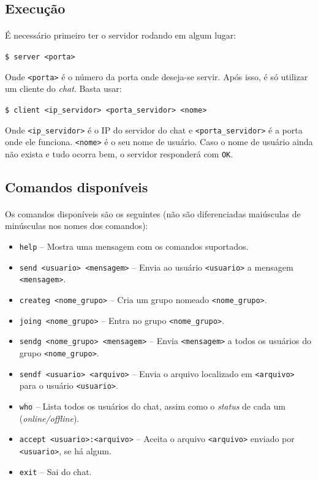\documentclass[11pt]{article}
\newcommand{\tit}[1]{\textit{#1}}
\newcommand{\ttt}[1]{\texttt{#1}}
\begin{document}
\subsection{Execução}
\paragraph{}
É necessário primeiro ter o servidor rodando em algum lugar:

\ttt{\$ server <porta>}

Onde \ttt{<porta>} é o número da porta onde deseja-se servir.
Após isso, é só utilizar um cliente do \tit{chat}. Basta usar:

\ttt{\$ client <ip\_servidor> <porta\_servidor> <nome>}

Onde \ttt{<ip\_servidor>} é o IP do servidor do chat e \ttt{<porta\_servidor>} 
é a porta onde ele funciona. 
\ttt{<nome>} é o seu nome de usuário. 
Caso o nome de usuário ainda não exista e tudo ocorra bem, o servidor 
responderá com \ttt{OK}\@.

\subsection{Comandos disponíveis}
\paragraph{}
Os comandos disponíveis são os seguintes \:
(não são diferenciadas maiúsculas de minúsculas nos nomes dos comandos):
\begin{itemize}
	\item \ttt{help} -- Mostra uma mensagem com os comandos suportados.
	\item \ttt{send <usuario> <mensagem>}
		-- Envia ao usuário \ttt{<usuario>} a mensagem \ttt{<mensagem>}.
	\item \ttt{createg <nome\_grupo>}
		-- Cria um grupo nomeado \ttt{<nome\_grupo>}.
	\item \ttt{joing <nome\_grupo>}
		-- Entra no grupo \ttt{<nome\_grupo>}.
	\item \ttt{sendg <nome\_grupo> <mensagem>}
		-- Envia \ttt{<mensagem>} a todos os usuários do 
		grupo \ttt{<nome\_grupo>}.
	\item \ttt{sendf <usuario> <arquivo>}
		-- Envia o arquivo localizado em \ttt{<arquivo>} para o usuário
		\ttt{<usuario>}.
	\item \ttt{who} -- Lista todos os usuários do chat, assim como o 
		\tit{status} de cada um (\tit{online/offline}).
	\item \ttt{accept <usuario>:<arquivo>}
		-- Aceita o arquivo \ttt{<arquivo>} enviado por \ttt{<usuario>},
		se há algum.
	\item \ttt{exit} -- Sai do chat.
\end{itemize}
\end{document}
